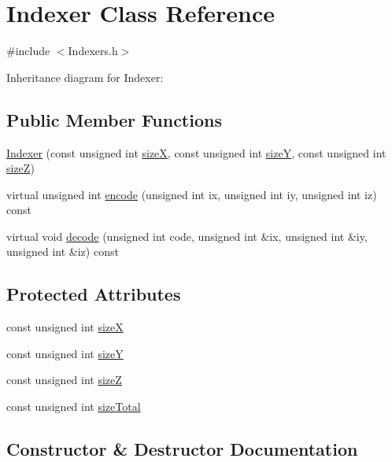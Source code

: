 \hypertarget{class_indexer}{}\section{Indexer Class Reference}
\label{class_indexer}


{\ttfamily \#include $<$Indexers.\+h$>$}



Inheritance diagram for Indexer\+:
\subsection*{Public Member Functions}
\begin{DoxyCompactItemize}
\item 
\hyperlink{class_indexer_a5970ece298765928cb7fff37f479f0c5}{Indexer} (const unsigned int \hyperlink{class_indexer_a676432f4a3f9853c4b32b0661abeab4b}{size\+X}, const unsigned int \hyperlink{class_indexer_a63c52b7b6c393faaea438666b722f514}{size\+Y}, const unsigned int \hyperlink{class_indexer_a054ea5515e47670dd528c1520c2fa698}{size\+Z})
\item 
virtual unsigned int \hyperlink{class_indexer_a989c05a88fd75f782091925d3b043453}{encode} (unsigned int ix, unsigned int iy, unsigned int iz) const 
\item 
virtual void \hyperlink{class_indexer_a25518049d34df74617ca795b5f7efcdf}{decode} (unsigned int code, unsigned int \&ix, unsigned int \&iy, unsigned int \&iz) const 
\end{DoxyCompactItemize}
\subsection*{Protected Attributes}
\begin{DoxyCompactItemize}
\item 
const unsigned int \hyperlink{class_indexer_a676432f4a3f9853c4b32b0661abeab4b}{size\+X}
\item 
const unsigned int \hyperlink{class_indexer_a63c52b7b6c393faaea438666b722f514}{size\+Y}
\item 
const unsigned int \hyperlink{class_indexer_a054ea5515e47670dd528c1520c2fa698}{size\+Z}
\item 
const unsigned int \hyperlink{class_indexer_a502d6da55d821465c7e050cdbc873a97}{size\+Total}
\end{DoxyCompactItemize}


\subsection{Constructor \& Destructor Documentation}
\hypertarget{class_indexer_a5970ece298765928cb7fff37f479f0c5}{}
